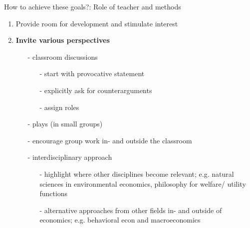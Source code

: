 \begin{frame}{How to achieve these goals?: Role of teacher \alert{and methods}}
	\begin{enumerate}
		\item Provide room for development and stimulate interest
		\item \alert{\textbf{Invite various perspectives}}
		\begin{itemize}[<+->]
			\item[-] classroom discussions
			\begin{itemize}
				\item[-] start with provocative statement
				\item[-] explicitly  ask for counterarguments
				\item[-] assign roles
			\end{itemize}
			\item[-] plays (in small groups)
			\item[-] encourage group work in- and outside the classroom
			\item[-] interdisciplinary approach
			\begin{itemize}
				\item[-] highlight where other disciplines become relevant; e.g. natural sciences in environmental economics, philosophy for welfare/ utility functions
				\item[-] alternative approaches from other fields in- and outside of economics; e.g. behavioral econ and macroeconomics
			\end{itemize}

\end{itemize}
\end{enumerate}
\end{frame}
